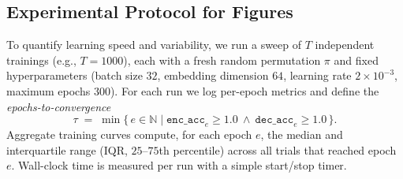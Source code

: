 \documentclass[12pt]{article}
\theoremstyle{plain}
\theoremstyle{remark}
\begin{document}
\subsection*{Experimental Protocol for Figures}
To quantify learning speed and variability, we run a sweep of $T$ independent trainings (e.g., $T=1000$), each with a fresh random permutation $\pi$ and fixed hyperparameters (batch size $32$, embedding dimension $64$, learning rate $2\times10^{-3}$, maximum epochs $300$). For each run we log per-epoch metrics and define the \emph{epochs-to-convergence}
\[
\tau \;=\; \min\{\,e\in\mathbb{N} \;|\; \texttt{enc\_acc}_e \ge 1.0 \ \wedge\  \texttt{dec\_acc}_e \ge 1.0 \,\}.
\]
Aggregate training curves compute, for each epoch $e$, the median and interquartile range (IQR, $25$--$75$th percentile) across all trials that reached epoch $e$. Wall-clock time is measured per run with a simple start/stop timer.
\end{document}
